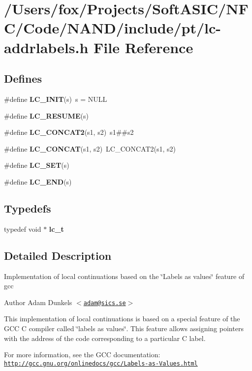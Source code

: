 \hypertarget{lc-addrlabels_8h}{
\section{/Users/fox/Projects/SoftASIC/NFC/Code/NAND/include/pt/lc-\/addrlabels.h File Reference}
\label{lc-addrlabels_8h}
}
\subsection*{Defines}
\begin{DoxyCompactItemize}
\item 
\hypertarget{group__lc_ga2c1bb4fa6d7a6ff951a41c73fc721109}{
\#define {\bfseries LC\_\-INIT}(s)~s = NULL}
\label{group__lc_ga2c1bb4fa6d7a6ff951a41c73fc721109}

\item 
\#define {\bfseries LC\_\-RESUME}(s)
\item 
\hypertarget{group__lc_ga6e1e879e172e2d8838e5f567dac8918c}{
\#define {\bfseries LC\_\-CONCAT2}(s1, s2)~s1\#\#s2}
\label{group__lc_ga6e1e879e172e2d8838e5f567dac8918c}

\item 
\hypertarget{group__lc_ga2b1f9b9fe8b6895b156f0af10538971c}{
\#define {\bfseries LC\_\-CONCAT}(s1, s2)~LC\_\-CONCAT2(s1, s2)}
\label{group__lc_ga2b1f9b9fe8b6895b156f0af10538971c}

\item 
\#define {\bfseries LC\_\-SET}(s)
\item 
\hypertarget{group__lc_gaca51ceb2f5d855dfde55bcedf8d3b92d}{
\#define {\bfseries LC\_\-END}(s)}
\label{group__lc_gaca51ceb2f5d855dfde55bcedf8d3b92d}

\end{DoxyCompactItemize}
\subsection*{Typedefs}
\begin{DoxyCompactItemize}
\item 
\hypertarget{group__lc_ga2bdc4b7b4038454a79f1b2a94a6d2a98}{
typedef void $\ast$ {\bfseries lc\_\-t}}
\label{group__lc_ga2bdc4b7b4038454a79f1b2a94a6d2a98}

\end{DoxyCompactItemize}


\subsection{Detailed Description}
Implementation of local continuations based on the \char`\"{}Labels as
 values\char`\"{} feature of gcc \begin{DoxyAuthor}{Author}
Adam Dunkels $<$\href{mailto:adam@sics.se}{\tt adam@sics.se}$>$
\end{DoxyAuthor}
This implementation of local continuations is based on a special feature of the GCC C compiler called \char`\"{}labels as values\char`\"{}. This feature allows assigning pointers with the address of the code corresponding to a particular C label.

For more information, see the GCC documentation: \href{http://gcc.gnu.org/onlinedocs/gcc/Labels-as-Values.html}{\tt http://gcc.gnu.org/onlinedocs/gcc/Labels-\/as-\/Values.html} 